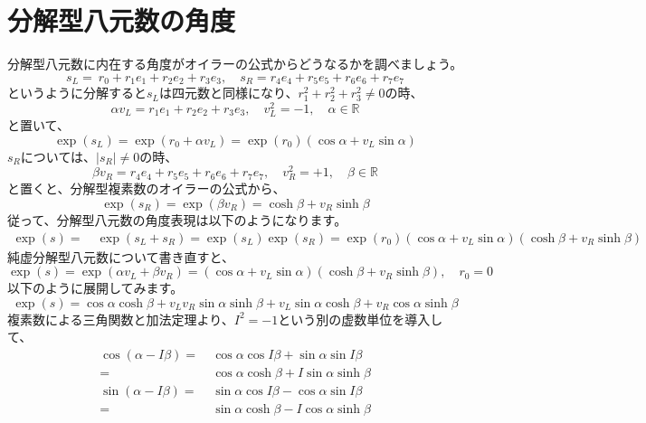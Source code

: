 \documentclass[a4paper,12pt,notitlepage]{jsreport}
\begin{document}
\section{分解型八元数の角度}

分解型八元数に内在する角度がオイラーの公式からどうなるかを調べましょう。
\begin{equation}
  s_L=~r_0+r_1e_1+r_2e_2+r_3e_3,\quad s_R=r_4e_4+r_5e_5+r_6e_6+r_7e_7
\end{equation}
というように分解すると$s_L$は四元数と同様になり、$r_1^2+r_2^2+r_3^2\ne 0$の時、
\begin{equation}
  \alpha v_L=r_1e_1+r_2e_2+r_3e_3,\quad v_L^2=-1,\quad \alpha\in\mathbb{R}
\end{equation}
と置いて、
\begin{equation}
  \exp(s_L)=\exp(r_0+\alpha v_L)=\exp(r_0)(\cos \alpha+v_L\sin\alpha)
\end{equation}
$s_R$については、$|s_R|\ne 0$の時、
\begin{equation}
  \beta v_R=r_4e_4+r_5e_5+r_6e_6+r_7e_7,\quad v_R^2=+1,\quad \beta\in\mathbb{R}
\end{equation}
と置くと、分解型複素数のオイラーの公式から、
\begin{equation}
  \exp(s_R)=\exp(\beta v_R)=\cosh \beta+v_R\sinh \beta
\end{equation}
従って、分解型八元数の角度表現は以下のようになります。
\begin{equation}
  \begin{split}
    \exp(s)=~&\exp(s_L+s_R)=\exp(s_L)\exp(s_R)
    =\exp(r_0)(\cos\alpha+v_L\sin\alpha)(\cosh\beta+v_R\sinh\beta)
  \end{split}
\end{equation}
純虚分解型八元数について書き直すと、
\begin{equation}
  \exp(s)=\exp(\alpha v_L+\beta v_R)=(\cos\alpha+v_L\sin\alpha)(\cosh\beta+v_R\sinh\beta),\quad r_0=0
\end{equation}
以下のように展開してみます。
\begin{equation}
  \exp(s)=\cos\alpha\cosh\beta+v_Lv_R\sin\alpha\sinh\beta+v_L\sin\alpha\cosh\beta+v_R\cos\alpha\sinh\beta
\end{equation}
複素数による三角関数と加法定理より、$I^2=-1$という別の虚数単位を導入して、
\begin{equation}
  \begin{split}
    \cos(\alpha-I\beta)=~&\cos\alpha\cos I\beta+\sin\alpha\sin I\beta\\
    =~&\cos\alpha\cosh\beta+I\sin\alpha\sinh\beta\\
    \sin(\alpha-I\beta)=~&\sin\alpha\cos I\beta-\cos\alpha\sin I\beta\\
    =~&\sin\alpha\cosh\beta-I\cos\alpha\sinh\beta\\
  \end{split}
\end{equation}
\end{document}
